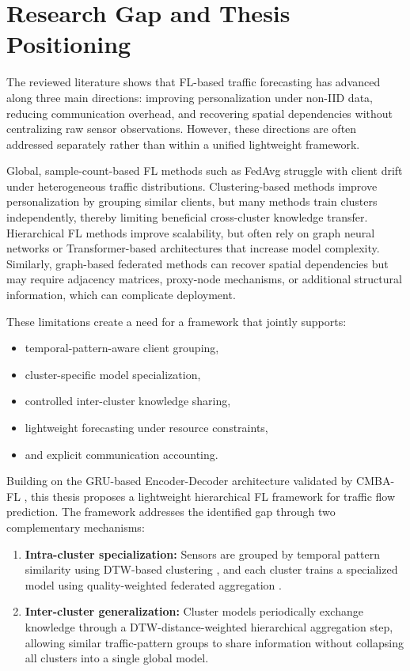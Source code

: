 \section{Research Gap and Thesis Positioning}
\label{sec:gap}

The reviewed literature shows that FL-based traffic forecasting has advanced along three main directions: improving personalization under non-IID data, reducing communication overhead, and recovering spatial dependencies without centralizing raw sensor observations. However, these directions are often addressed separately rather than within a unified lightweight framework.

Global, sample-count-based FL methods such as FedAvg struggle with client drift under heterogeneous traffic distributions. Clustering-based methods improve personalization by grouping similar clients, but many methods train clusters independently, thereby limiting beneficial cross-cluster knowledge transfer. Hierarchical FL methods improve scalability, but often rely on graph neural networks or Transformer-based architectures that increase model complexity. Similarly, graph-based federated methods can recover spatial dependencies but may require adjacency matrices, proxy-node mechanisms, or additional structural information, which can complicate deployment.

These limitations create a need for a framework that jointly supports:

\begin{itemize}
    \item temporal-pattern-aware client grouping,
    \item cluster-specific model specialization,
    \item controlled inter-cluster knowledge sharing,
    \item lightweight forecasting under resource constraints,
    \item and explicit communication accounting.
\end{itemize}

Building on the GRU-based Encoder-Decoder architecture validated by CMBA-FL \cite{zhu2025cmba}, this thesis proposes a lightweight hierarchical FL framework for traffic flow prediction. The framework addresses the identified gap through two complementary mechanisms:

\begin{enumerate}
    \item \textbf{Intra-cluster specialization:} Sensors are grouped by temporal pattern similarity using DTW-based clustering \cite{feng2024}, and each cluster trains a specialized model using quality-weighted federated aggregation \cite{dai2024}.
    
    \item \textbf{Inter-cluster generalization:} Cluster models periodically exchange knowledge through a DTW-distance-weighted hierarchical aggregation step, allowing similar traffic-pattern groups to share information without collapsing all clusters into a single global model.
\end{enumerate}

